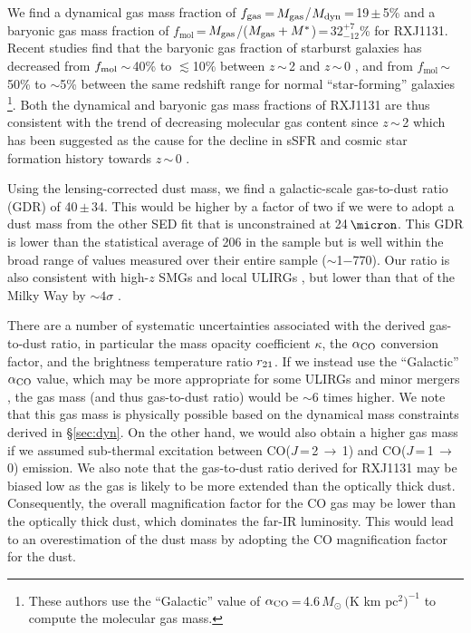 \documentclass[]{emulateapj}
\newcommand{\rarr}{$\rightarrow$}
\newcommand{\aco}{\mbox{CO($J$\,=\,1\,\rarr\,0)}\xspace}
\newcommand{\bco}{\mbox{CO($J$\,=\,2\,\rarr\,1)}\xspace}
\newcommand{\alphaco}{\mbox{$\alpha_{\rm CO}$}\xspace}
\newcommand{\alphaU}{\mbox{$M_{\odot}~($K\,\,km\,\,pc$^2)^{-1}$}\xspace}
\newcommand{\petm}[2]{$^{+#1}_{-#2}$}
\newcommand{\eq}{\,=\,}
\newcommand{\ssim}{\,$\sim$\,}
\newcommand{\pmm}{\,$\pm$\,}
\newcommand{\eg}{{e.g.,~}}
\newcommand{\Sec}[1]{\S\ref{sec:#1}}
\newcommand{\SF}{star formation\xspace}
\newcommand{\fir}{far-IR\xspace}
\begin{document}
We find a dynamical gas mass fraction of $f_{\rm gas}$\eq$M_{\rm gas}$/$M_{\rm dyn}$\eq19\pmm5\%
and a baryonic gas mass fraction of $f_\textrm{mol}$\eq$M_{\rm gas}$/($M_{\rm gas} + M^*$)\eq32\petm{7}{12}\% for RXJ1131.
Recent studies find that the baryonic gas fraction of starburst galaxies has decreased from $f_{\rm mol}$\ssim40\% to $\lesssim$10\% between $z$\ssim2 and $z$\ssim0 \citep[;][]{GS04a, Tacconi06a},
and from $f_\textrm{mol}$\ssim50\% to $\sim$5\% between the same redshift range for
normal ``star-forming'' galaxies \citep{Geach11a, Saintonge11a, Tacconi13a}\footnote{These authors use the ``Galactic'' value of
\alphaco\eq4.6\,\alphaU to compute the molecular gas mass.}.
Both the dynamical and baryonic gas mass fractions of RXJ1131 are thus consistent with the trend of decreasing molecular gas content since $z$\ssim2
which has been suggested as the cause for the decline in sSFR and cosmic \SF history towards $z$\ssim0 \citep[e.g.,][]{Tacconi13a,CW13,Genzel15a}.


Using the lensing-corrected dust mass, we find a galactic-scale
gas-to-dust ratio (GDR) of
40\pmm34.
This would be higher by a factor of two if we were to adopt a dust mass from the other SED fit that is unconstrained at 24\,$\micron$.
This GDR is lower than the statistical average of 206
in the  sample but is well within the broad
range of values measured over their entire sample ($\sim$1$-$770).
Our ratio is also consistent with high-$z$ SMGs
\citep[]{Bothwell13a} and
local ULIRGs \citep{Wilson08a}, but lower than that of the Milky Way by
$\sim 4\sigma$ \citep[ignoring systematic uncertainties;][]{Li01a,Zubko04a,Draine07a}.

There are a number of systematic uncertainties associated with the derived gas-to-dust ratio, in particular
the mass opacity coefficient $\kappa$,
the \alphaco conversion factor, and the brightness temperature ratio $r_{\rm 21}$.
If we instead use the ``Galactic'' \alphaco value, which may be more appropriate for some ULIRGs \citep[\eg][]{Papadopoulos12a} and minor mergers \citep{Narayanan12a},
the gas mass (and thus gas-to-dust ratio) would be $\sim$6 times higher.
We note that this gas mass is physically possible based on the dynamical mass constraints derived in \Sec{dyn}.
On the other hand, we would also obtain a higher gas mass if
we assumed sub-thermal excitation between \bco and \aco emission.
We also note that the gas-to-dust ratio derived for RXJ1131 may be biased low as the gas is likely to
be more extended than the optically thick dust. Consequently, the overall magnification factor
for the CO gas may be lower than the optically thick dust, which dominates the \fir luminosity.
This would lead to an overestimation of the dust mass
by adopting the CO magnification factor for the dust.
\end{document}
